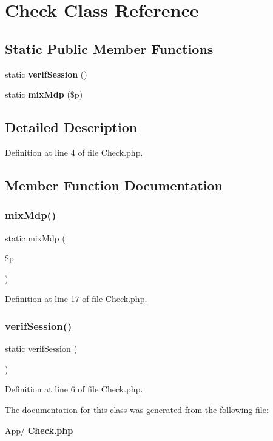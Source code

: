\section{Check Class Reference}
\label{class_app_1_1_check}
\subsection*{Static Public Member Functions}
\begin{DoxyCompactItemize}
\item 
static \textbf{ verif\+Session} ()
\item 
static \textbf{ mix\+Mdp} (\$p)
\end{DoxyCompactItemize}


\subsection{Detailed Description}


Definition at line 4 of file Check.\+php.



\subsection{Member Function Documentation}
\mbox{\label{class_app_1_1_check_a6ad7e08262ba342da3f69a34a5536eb6}} 
\subsubsection{mix\+Mdp()}
{\footnotesize\ttfamily static mix\+Mdp (\begin{DoxyParamCaption}\item[{}]{\$p }\end{DoxyParamCaption})\hspace{0.3cm}{\ttfamily [static]}}



Definition at line 17 of file Check.\+php.

\mbox{\label{class_app_1_1_check_a762802022c6341f5a11a5bd2d24e374a}} 
\subsubsection{verif\+Session()}
{\footnotesize\ttfamily static verif\+Session (\begin{DoxyParamCaption}{ }\end{DoxyParamCaption})\hspace{0.3cm}{\ttfamily [static]}}



Definition at line 6 of file Check.\+php.



The documentation for this class was generated from the following file\+:\begin{DoxyCompactItemize}
\item 
App/\textbf{ Check.\+php}\end{DoxyCompactItemize}
